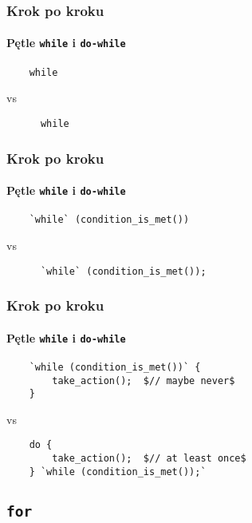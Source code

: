 \documentclass[aspectratio=169]{beamer}
\begin{document}
\begin{frame}[fragile]
    \frametitle{Krok po kroku}
    \framesubtitle{Pętle {\tt while} i {\tt do-while}}

    \begin{lstlisting}
    while
    \end{lstlisting}
    \vspace{2.4em}

    vs

    \vspace{2.4em}
    \begin{lstlisting}
      while
    \end{lstlisting}
\end{frame}

\begin{frame}[fragile]
    \frametitle{Krok po kroku}
    \framesubtitle{Pętle {\tt while} i {\tt do-while}}

    \begin{lstlisting}
    `while` (condition_is_met())
    \end{lstlisting}
    \vspace{2.4em}

    vs

    \vspace{2.4em}
    \begin{lstlisting}
      `while` (condition_is_met());
    \end{lstlisting}
\end{frame}

\begin{frame}[fragile]
    \frametitle{Krok po kroku}
    \framesubtitle{Pętle {\tt while} i {\tt do-while}}

    \begin{lstlisting}
    `while (condition_is_met())` {
        take_action();  $// maybe never$
    }
    \end{lstlisting}

    vs

    \begin{lstlisting}
    do {
        take_action();  $// at least once$
    } `while (condition_is_met());`
    \end{lstlisting}
\end{frame}

\subsection{{\tt for}}
\end{document}
